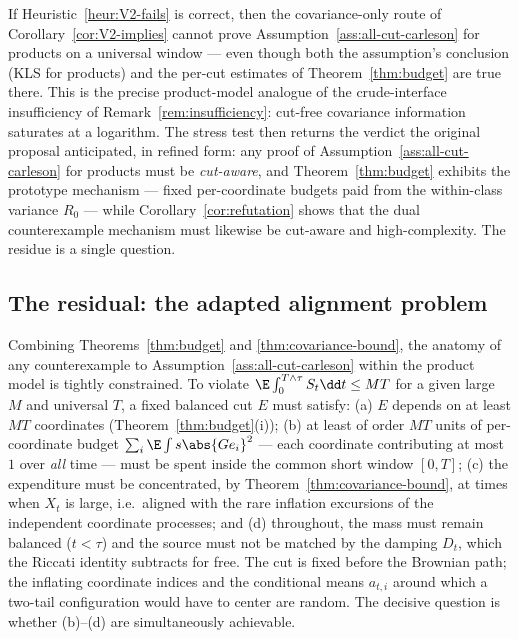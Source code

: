 \documentclass[../../main.tex]{subfiles}
\begin{document}
\begin{remark}
\label{rem:covariance-route-dead}
If Heuristic~\ref{heur:V2-fails} is correct, then the covariance-only route of
Corollary~\ref{cor:V2-implies} cannot prove Assumption~\ref{ass:all-cut-carleson} for products on a universal window
--- even though both the assumption's conclusion (KLS for products) and the per-cut estimates
of Theorem~\ref{thm:budget} are true there. This is the precise product-model analogue of the
crude-interface insufficiency of Remark~\ref{rem:insufficiency}: cut-free covariance information
saturates at a logarithm. The stress test then returns the verdict the original proposal
anticipated, in refined form: any proof of Assumption~\ref{ass:all-cut-carleson} for products must be
\emph{cut-aware}, and Theorem~\ref{thm:budget} exhibits the prototype mechanism --- fixed
per-coordinate budgets paid from the within-class variance $R_0$ --- while
Corollary~\ref{cor:refutation} shows that the dual counterexample mechanism must likewise be
cut-aware and high-complexity. The residue is a single question.
\end{remark}

\subsection{The residual: the adapted alignment problem}
\label{sec:residual}

Combining Theorems~\ref{thm:budget} and \ref{thm:covariance-bound}, the anatomy of any
counterexample to Assumption~\ref{ass:all-cut-carleson} within the product model is tightly constrained. To violate
$\E\int_0^{T\wedge\tau}S_t\dd t\le MT$ for a given large $M$ and universal $T$, a fixed
balanced cut $E$ must satisfy: (a) $E$ depends on at least $MT$ coordinates
(Theorem~\ref{thm:budget}(i)); (b) at least of order $MT$ units of per-coordinate budget
$\sum_i\E\int s\abs{Ge_i}^2$ --- each coordinate contributing at most $1$ over \emph{all}
time --- must be spent inside the common short window $[0,T]$; (c) the expenditure must be
concentrated, by Theorem~\ref{thm:covariance-bound}, at times when $X_t$ is large, i.e.\
aligned with the rare inflation excursions of the independent coordinate processes; and
(d) throughout, the mass must remain balanced ($t<\tau$) and the source must not be matched
by the damping $D_t$, which the Riccati identity subtracts for free. The cut is fixed before
the Brownian path; the inflating coordinate indices and the conditional means $a_{t,i}$
around which a two-tail configuration would have to center are random. The decisive question
is whether (b)--(d) are simultaneously achievable.
\end{document}
